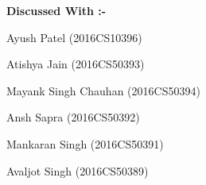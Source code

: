 \documentclass[11pt]{article}
\begin{document}
    \vspace{\baselineskip}
    \vspace{\baselineskip}

    \textbf{Discussed With :- }
    \newline
    
    Ayush Patel (2016CS10396)
    
    Atishya Jain (2016CS50393)
    
    Mayank Singh Chauhan (2016CS50394)
    
    Ansh Sapra (2016CS50392)
    
    Mankaran Singh (2016CS50391)
    
    Avaljot Singh (2016CS50389)
\end{document}
